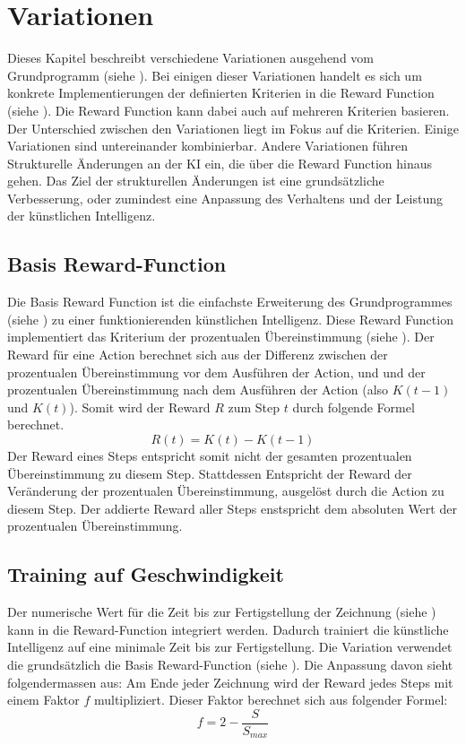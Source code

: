 \section{Variationen}
\label{chap:m_var}
Dieses Kapitel beschreibt verschiedene Variationen ausgehend vom Grundprogramm
(siehe ). Bei einigen dieser Variationen handelt es sich
um konkrete Implementierungen der definierten Kriterien in die Reward Function
(siehe ). Die Reward Function kann dabei auch auf
mehreren Kriterien basieren. Der Unterschied zwischen den Variationen liegt im
Fokus auf die Kriterien. Einige Variationen sind untereinander kombinierbar.
Andere Variationen führen Strukturelle Änderungen an der KI ein, die über die
Reward Function hinaus gehen. Das Ziel der strukturellen Änderungen ist eine
grundsätzliche Verbesserung, oder zumindest eine Anpassung des Verhaltens und
der Leistung der künstlichen Intelligenz. 

\subsection{Basis Reward-Function}
\label{sub:m_var_base}
Die Basis Reward Function ist die einfachste Erweiterung des Grundprogrammes
(siehe ) zu einer funktionierenden künstlichen
Intelligenz. Diese Reward Function implementiert das Kriterium der prozentualen
Übereinstimmung (siehe ). Der Reward für eine Action
berechnet sich aus der Differenz zwischen der prozentualen Übereinstimmung vor
dem Ausführen der Action, und und der prozentualen Übereinstimmung nach dem
Ausführen der Action (also $K(t-1)$ und $K(t)$). Somit wird der Reward $R$ zum
Step $t$ durch folgende Formel berechnet. 
$$R(t) = K(t) - K(t-1)$$ 
Der Reward eines Steps entspricht somit nicht der gesamten prozentualen
Übereinstimmung zu diesem Step. Stattdessen Entspricht der Reward der
Veränderung der prozentualen Übereinstimmung, ausgelöst durch die Action zu diesem
Step. Der addierte Reward aller Steps enstspricht dem absoluten Wert der
prozentualen Übereinstimmung.


\subsection{Training auf Geschwindigkeit}
\label{sub:m_var_speed}
Der numerische Wert für die Zeit bis zur Fertigstellung der Zeichnung (siehe
) kann in die Reward-Function integriert werden.
Dadurch trainiert die künstliche Intelligenz auf eine minimale Zeit bis zur
Fertigstellung. Die Variation verwendet die grundsätzlich die Basis
Reward-Function (siehe ). Die Anpassung davon sieht
folgendermassen aus: Am Ende jeder Zeichnung wird der Reward jedes Steps mit
einem Faktor $f$ multipliziert. Dieser Faktor berechnet sich aus folgender
Formel:
$$f = 2 - \frac{S}{S_{max}}$$ 

